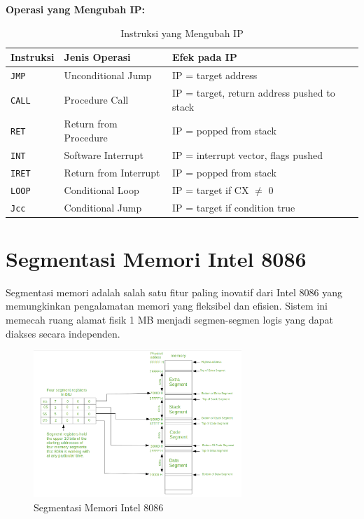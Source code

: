\textbf{Operasi yang Mengubah IP:}
\begin{table}[h]
\centering
\caption{Instruksi yang Mengubah IP}
\begin{tabular}{|p{3cm}|p{4cm}|p{8cm}|}
\hline
\textbf{Instruksi} & \textbf{Jenis Operasi} & \textbf{Efek pada IP} \\
\hline
\texttt{JMP} & Unconditional Jump & IP = target address \\
\hline
\texttt{CALL} & Procedure Call & IP = target, return address pushed to stack \\
\hline
\texttt{RET} & Return from Procedure & IP = popped from stack \\
\hline
\texttt{INT} & Software Interrupt & IP = interrupt vector, flags pushed \\
\hline
\texttt{IRET} & Return from Interrupt & IP = popped from stack \\
\hline
\texttt{LOOP} & Conditional Loop & IP = target if CX $\neq$ 0 \\
\hline
\texttt{Jcc} & Conditional Jump & IP = target if condition true \\
\hline
\end{tabular}
\label{tab:ip-modifying-instructions}
\end{table}

\section{Segmentasi Memori Intel 8086}
Segmentasi memori adalah salah satu fitur paling inovatif dari Intel 8086 yang memungkinkan pengalamatan memori yang fleksibel dan efisien. Sistem ini memecah ruang alamat fisik 1 MB menjadi segmen-segmen logis yang dapat diakses secara independen.

\begin{figure}[h]
\centering
\includegraphics[width=0.7\textwidth]{8086_memory_segmentation.png}
\caption{Segmentasi Memori Intel 8086}
\label{fig:8086-memory-segmentation}
\end{figure}

